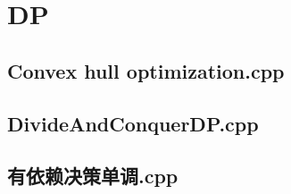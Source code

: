 \section{DP}

\subsection{Convex hull optimization.cpp}


\subsection{DivideAndConquerDP.cpp}


\subsection{有依赖决策单调.cpp}


